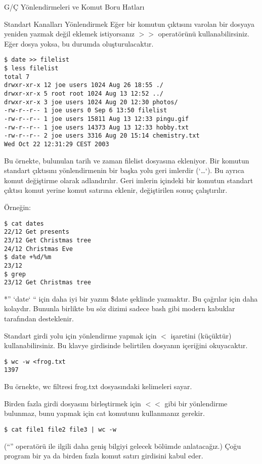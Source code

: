 \begin{section}{G/Ç Yönlendirmeleri ve Komut Boru Hatları}
\begin{subsection}{Standart Kanalları Yönlendirmek}
Eğer bir komutun çıktısını varolan bir dosyaya yeniden yazmak değil eklemek istiyorsanız $>>$ operatörünü kullanabilirsiniz. Eğer dosya yoksa, bu durumda oluşturulacaktır.
\begin{verbatim}
$ date >> filelist
$ less filelist
total 7
drwxr-xr-x 12 joe users 1024 Aug 26 18:55 ./
drwxr-xr-x 5 root root 1024 Aug 13 12:52 ../
drwxr-xr-x 3 joe users 1024 Aug 20 12:30 photos/
-rw-r--r-- 1 joe users 0 Sep 6 13:50 filelist
-rw-r--r-- 1 joe users 15811 Aug 13 12:33 pingu.gif
-rw-r--r-- 1 joe users 14373 Aug 13 12:33 hobby.txt
-rw-r--r-- 2 joe users 3316 Aug 20 15:14 chemistry.txt
Wed Oct 22 12:31:29 CEST 2003
\end{verbatim}

Bu örnekte, bulunulan tarih ve zaman filelist dosyasına ekleniyor. Bir komutun standart çıktısını yönlendirmenin bir başka yolu geri imlerdir (`\ldots`). Bu ayrıca komut değiştirme olarak adlandırılır. Geri imlerin içindeki bir komutun standart çıktısı komut yerine komut satırına eklenir, değiştirilen sonuç çalıştırılır.

Örneğin:
\begin{verbatim}
$ cat dates 		
22/12 Get presents
23/12 Get Christmas tree
24/12 Christmas Eve
$ date +%d/%m 			
23/12
$ grep 			
23/12 Get Christmas tree
\end{verbatim}

*” `date` “ için daha iyi bir yazım \$date şeklinde yazmaktır. Bu çağrılar için daha kolaydır. Bununla birlikte bu söz dizimi sadece bash gibi modern kabuklar tarafından desteklenir.

Standart girdi yolu için yönlendirme yapmak için $<$ işaretini (küçüktür) kullanabilirsiniz. Bu klavye girdisinde belirtilen dosyanın içeriğini okuyacaktır. 
\begin{verbatim}
$ wc -w <frog.txt 
1397 
\end{verbatim}

Bu örnekte, wc filtresi frog.txt dosyasındaki kelimeleri sayar.

Birden fazla girdi dosyasını birleştirmek için $<<$ gibi bir yönlendirme bulunmaz, bunu yapmak için cat komutunu kullanmanız gerekir.

\begin{verbatim}
$ cat file1 file2 file3 | wc -w
\end{verbatim}

(“\textbar” operatörü ile ilgili daha geniş bilgiyi gelecek bölümde anlatacağız.) Çoğu program bir ya da birden fazla komut satırı girdisini kabul eder.


\end{subsection}
\end{section}
